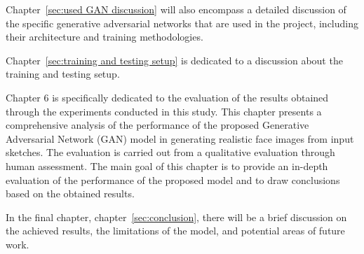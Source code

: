\noindent Chapter~\ref{sec:used GAN discussion} will also encompass a detailed discussion of the specific generative adversarial networks that are used in the project, including their architecture and training methodologies. 

\noindent Chapter~\ref{sec:training and testing setup} is dedicated to a discussion about the training and testing setup.

\noindent Chapter 6 is specifically dedicated to the evaluation of the results obtained through the experiments conducted in this study. This chapter presents a comprehensive analysis of the performance of the proposed Generative Adversarial Network (GAN) model in generating realistic face images from input sketches. The evaluation is carried out from a qualitative evaluation through human assessment. The main goal of this chapter is to provide an in-depth evaluation of the performance of the proposed model and to draw conclusions based on the obtained results.

\noindent In the final chapter, chapter~\ref{sec:conclusion}, there will be a brief discussion on the achieved results, the limitations of the model, and potential areas of future work.